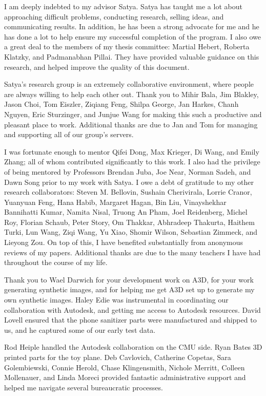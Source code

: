 \documentclass[12pt]{cmuthesis}
\begin{document}
\begin{acknowledgments}
  I am deeply indebted to my advisor Satya.
  Satya has taught me a lot about approaching difficult problems, conducting
  research, selling ideas, and communicating results.
  In addition, he has been a strong advocate for me and he has done a lot to
  help ensure my successful completion of the program.
  I also owe a great deal to the members of my thesis committee: Martial Hebert,
  Roberta Klatzky, and Padmanabhan Pillai.
  They have provided valuable guidance on this research, and helped improve the
  quality of this document.

  Satya's research group is an extremely collaborative environment, where
  people are always willing to help each other out.
  Thank you to Mihir Bala, Jim Blakley, Jason Choi, Tom Eiszler, Ziqiang Feng,
  Shilpa George, Jan Harkes, Chanh Nguyen, Eric Sturzinger, and Junjue Wang
  for making this such a productive and pleasant place to work.
  Additional thanks are due to Jan and Tom for managing and supporting all of
  our group's servers.

  I was fortunate enough to mentor Qifei Dong, Max Krieger, Di Wang, and Emily
  Zhang; all of whom contributed significantly to this work.
  I also had the privilege of being mentored by Professors Brendan Juba,
  Joe Near, Norman Sadeh, and Dawn Song prior to my work with Satya.
  I owe a debt of gratitude to my other research collaborators:
  Steven M. Bellovin, Sushain Cherivirala, Lorrie Cranor, Yuanyuan Feng, Hana
  Habib, Margaret Hagan, Bin Liu, Vinayshekhar Bannihatti Kumar, Namita Nisal,
  Truong An Pham, Joel Reidenberg, Michel Roy, Florian Schaub, Peter Story,
  Om Thakkar, Abhradeep Thakurta, Haithem Turki, Lun Wang, Ziqi Wang, Yu Xiao,
  Shomir Wilson, Sebastian Zimmeck, and Lieyong Zou.
  On top of this, I have benefited substantially from anonymous reviews of my
  papers.
  Additional thanks are due to the many teachers I have had throughout the
  course of my life.

  Thank you to Wael Darwich for your development work on A3D, for your work
  generating synthetic images, and for helping me get A3D set up to generate my
  own synthetic images.
  Haley Edie was instrumental in coordinating our collaboration with Autodesk,
  and getting me access to Autodesk resources.
  David Lovell ensured that the phone sanitizer parts were manufactured and
  shipped to us, and he captured some of our early test data.

  Rod Heiple handled the Autodesk collaboration on the CMU side.
  Ryan Bates 3D printed parts for the toy plane.
  Deb Cavlovich, Catherine Copetas, Sara Golembiewski, Connie Herold,
  Chase Klingensmith, Nichole Merritt, Colleen Mollenauer, and Linda Moreci
  provided fantastic administrative support and helped me navigate several
  bureaucratic processes.


\end{acknowledgments}
\end{document}
